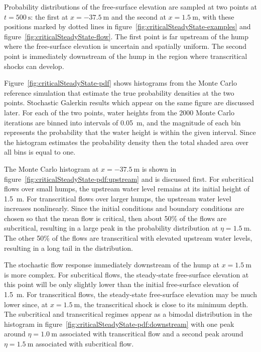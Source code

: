 Probability distributions of the free-surface elevation are sampled at two points at $t =
\SI{500}{\second}$: the first at $x =
\SI{-37.5}{\meter}$ and the second at $x
= \SI{1.5}{\meter}$, with these positions marked by dotted lines in
figure~\ref{fig:criticalSteadyState-examples} and
figure~\ref{fig:criticalSteadyState-flow}.
The first point is far upstream of the hump where the free-surface elevation is uncertain and spatially uniform.
The second point is immediately downstream of the hump in the region where transcritical shocks can develop.

Figure~\ref{fig:criticalSteadyState-pdf} shows histograms from the Monte Carlo reference simulation that estimate the true probability densities at the two points.
Stochastic Galerkin results which appear on the same figure are discussed later.
For each of the two points, water heights from the 2000 Monte Carlo iterations are binned into intervals of \SI{0.05}{\meter}, and the magnitude of each bin represents the probability that the water height is within the given interval.
Since the histogram estimates the probability density then the total shaded area over all bins is equal to one.

The Monte Carlo histogram at $x = \SI{-37.5}{\meter}$ is shown in figure~\ref{fig:criticalSteadyState-pdf:upstream} and is discussed first.
For subcritical flows over small humps, the upstream water level remains at its initial height of \SI{1.5}{\meter}.
For transcritical flows over larger humps, the upstream water level increases nonlinearly.
Since the initial conditions and boundary conditions are chosen so that the mean flow is critical, then about 50\% of the flows are subcritical, resulting in a large peak in the
probability distribution at $\eta = \SI{1.5}{\meter}$.
The other 50\% of the flows are transcritical with elevated upstream water levels, resulting in a long tail in the distribution.

The stochastic flow response immediately downstream of the hump at $x = \SI{1.5}{\meter}$ is more complex.
For subcritical flows, the steady-state free-surface elevation at this point will be only slightly lower than the initial free-surface elevation of \SI{1.5}{\meter}.
For transcritical flows, the steady-state free-surface elevation may be much lower since,  at $x = \SI{1.5}{\meter}$, the transcritical shock is close to its minimum depth.
The subcritical and transcritical regimes appear as a bimodal distribution in the histogram in figure~\ref{fig:criticalSteadyState-pdf:downstream} with one peak around $\eta = \SI{1.0}{\meter}$ associated with transcritical flow and a second peak around $\eta = \SI{1.5}{\meter}$ associated with subcritical flow.

